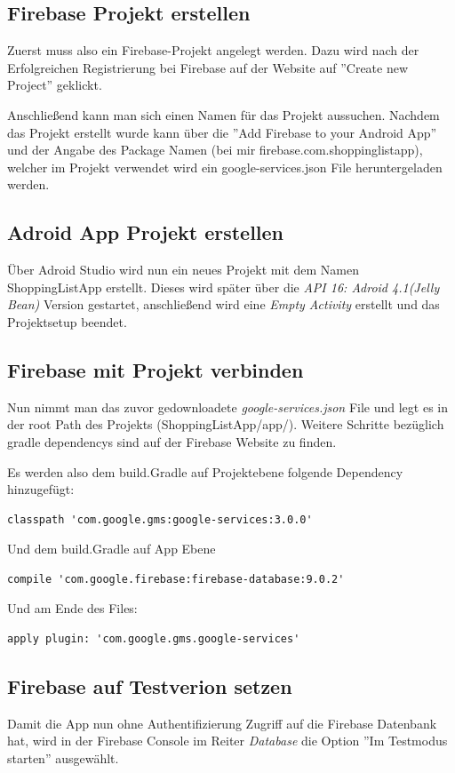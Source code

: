 \subsection{Firebase Projekt erstellen}
Zuerst muss also ein Firebase-Projekt angelegt werden. Dazu wird nach der Erfolgreichen Registrierung bei Firebase auf der Website auf ''Create new Project'' geklickt. 

Anschließend kann man sich einen Namen für das Projekt aussuchen. Nachdem das Projekt erstellt wurde kann über die ''Add Firebase to your Android App'' und der Angabe des Package Namen (bei mir firebase.com.shoppinglistapp), welcher im Projekt verwendet wird ein google-services.json File heruntergeladen werden.

\subsection{Adroid App Projekt erstellen}
Über Adroid Studio wird nun ein neues Projekt mit dem Namen ShoppingListApp erstellt.
Dieses wird später über die \textit{API 16: Adroid 4.1(Jelly Bean)} Version gestartet, anschließend wird eine \textit{Empty Activity} erstellt und das Projektsetup beendet. 

\subsection{Firebase mit Projekt verbinden}
Nun nimmt man das zuvor gedownloadete \textit{google-services.json} File und legt es in der root Path des Projekts (ShoppingListApp/app/). Weitere Schritte bezüglich gradle dependencys sind auf der Firebase Website zu finden. 

Es werden also dem build.Gradle auf Projektebene folgende Dependency hinzugefügt:

\begin{lstlisting}
classpath 'com.google.gms:google-services:3.0.0'
\end{lstlisting}

Und dem build.Gradle auf App Ebene
\begin{lstlisting}
compile 'com.google.firebase:firebase-database:9.0.2'
\end{lstlisting}

Und am Ende des Files:
\begin{lstlisting}
apply plugin: 'com.google.gms.google-services'
\end{lstlisting}
\clearpage
\subsection{Firebase auf Testverion setzen}
Damit die App nun ohne Authentifizierung Zugriff auf die Firebase Datenbank hat, wird in der Firebase Console im Reiter \textit{Database} die Option ''Im Testmodus starten'' ausgewählt. 

